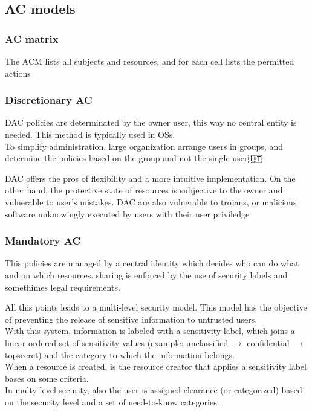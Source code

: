 \documentclass[12pt, a4paper]{article}
\begin{document}
\subsection{AC models}
\subsubsection{AC matrix}
The ACM lists all subjects and resources, and for each cell lists the permitted actions 

\subsubsection{Discretionary AC}
DAC policies are determinated by the owner user, this way no central entity is needed. This method is typically used 
in OSs.\\
To simplify administration, large organization arrange users in groups, and determine the policies based on the group
and not the single user🇮🇹

DAC offers the pros of flexibility and a more intuitive implementation. On the other hand, the protective state of 
resources is subjective to the owner and vulnerable to user's mistakes. DAC are also vulnerable to trojans, or 
malicious software unknowingly executed by users with their user priviledge

\subsubsection{Mandatory AC}
This policies are managed by a central identity which decides who can do what and on which resources. sharing
is enforced by the use of security labels and somethimes legal requirements.

All this points leads to a multi-level security model. This model has the objective of preventing the release of 
sensitive information to untrusted users.\\With this system, information is labeled with a sensitivity label, which 
joins a linear ordered set of sensitivity values (example: unclassified $\to$ confidential $\to$ topsecret) and the 
category to which the information belongs.\\When a resource is created, is the resource creator that applies a
sensitivity label bases on some criteria.\\
In multy level security, also the user is assigned clearance (or categorized) based on the security level and 
a set of need-to-know categories. 
\end{document}
